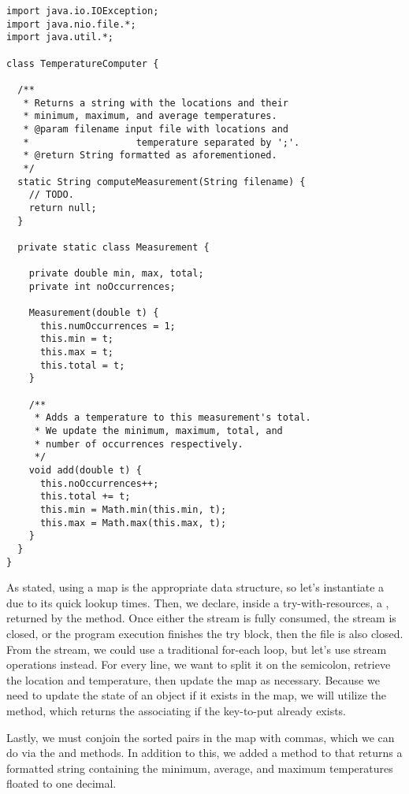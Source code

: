 \begin{lstlisting}[language=MyJava]
import java.io.IOException;
import java.nio.file.*;
import java.util.*;

class TemperatureComputer {
  
  /**
   * Returns a string with the locations and their 
   * minimum, maximum, and average temperatures.
   * @param filename input file with locations and 
   *                   temperature separated by ';'.
   * @return String formatted as aforementioned.
   */
  static String computeMeasurement(String filename) {
    // TODO.
    return null;
  }

  private static class Measurement {
  
    private double min, max, total;
    private int noOccurrences;

    Measurement(double t) {
      this.numOccurrences = 1;
      this.min = t;
      this.max = t;
      this.total = t;
    }

    /**
     * Adds a temperature to this measurement's total.
     * We update the minimum, maximum, total, and 
     * number of occurrences respectively.
     */
    void add(double t) {
      this.noOccurrences++;
      this.total += t;
      this.min = Math.min(this.min, t);
      this.max = Math.max(this.max, t);
    }
  }
}
\end{lstlisting}

As stated, using a map is the appropriate data structure, so let's instantiate a  due to its quick lookup times. 
Then, we declare, inside a try-with-resources, a , returned by the  method. 
Once either the stream is fully consumed, the stream is closed, or the program execution finishes the try block, then the file is also closed. 
From the stream, we could use a traditional for-each loop, but let's use stream operations instead. 
For every line, we want to split it on the semicolon, retrieve the location and temperature, then update the map as necessary. 
Because we need to update the state of an object if it exists in the map, we will utilize the  method, which returns the associating  if the key-to-put already exists.

Lastly, we must conjoin the sorted pairs in the map with commas, which we can do via the  and  methods. 
In addition to this, we added a  method to  that returns a formatted string containing the minimum, average, and maximum temperatures floated to one decimal.

